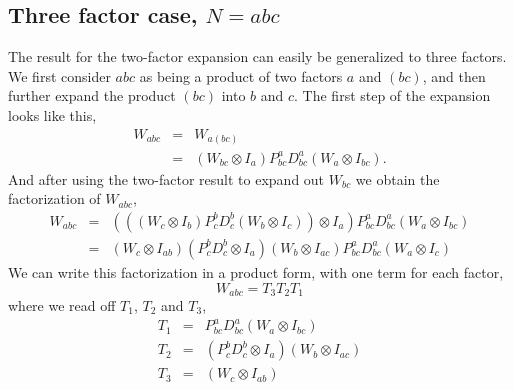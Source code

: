 \documentclass[fleqn,12pt]{article}
\begin{document}
\subsection{Three factor case, $N=abc$}
%
The result for the two-factor expansion can easily be generalized to
three factors. We first consider $abc$ as being a product of two
factors $a$ and $(bc)$, and then further expand the product $(bc)$ into
$b$ and $c$. The first step of the expansion looks like this,
%
\begin{eqnarray}
W_{abc} &=& W_{a(bc)}\\
&=& (W_{bc} \otimes I_a) P^a_{bc} D^a_{bc} (W_a \otimes I_{bc}) .
\end{eqnarray}
%
And after using the two-factor result to expand out $W_{bc}$ we obtain
the factorization of $W_{abc}$,
%
\begin{eqnarray}
W_{abc} &=& (((W_c \otimes I_b) P^b_c D^b_c (W_b \otimes I_c)) \otimes I_a )
P^a_{bc} D^a_{bc} (W_a \otimes I_{bc}) \\
&=& (W_c \otimes I_{ab}) (P^b_c D^b_c \otimes I_a) (W_b \otimes I_{ac}) P^a_{bc} D^a_{bc} (W_a \otimes I_c)
\end{eqnarray}
%
We can write this factorization in a product form, with one term for
each factor,
%
\begin{equation}
W_{abc} = T_3 T_2 T_1
\end{equation}
%
where we read off $T_1$, $T_2$ and $T_3$,
%
\begin{eqnarray}
T_1 &=& P^a_{bc} D^a_{bc} (W_a \otimes I_{bc}) \\
T_2 &=& (P^b_c D^b_c \otimes I_a) (W_b \otimes I_{ac}) \\
T_3 &=& (W_c \otimes I_{ab} ) 
\end{eqnarray}
%
\end{document}
